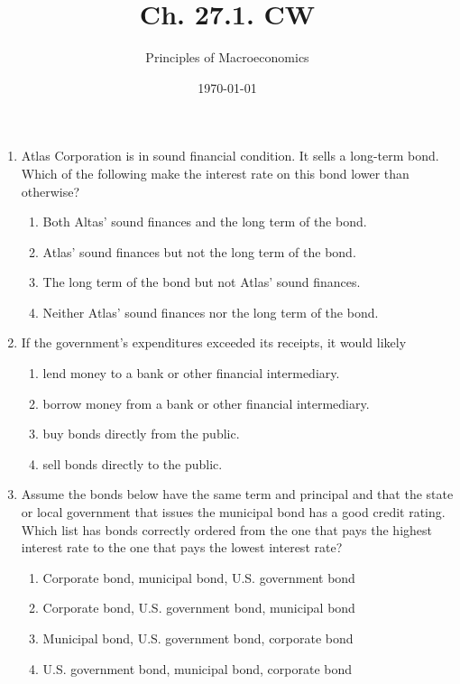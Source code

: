\documentclass{article}
\title{Ch. 27.1. CW}
\author{Principles of Macroeconomics}
\date{\today}
\begin{document}
\maketitle

\begin{enumerate}

\item Atlas Corporation is in sound financial condition. It sells a long-term bond. Which of the following make the interest
rate on this bond lower than otherwise?
	\begin{enumerate}
	\item Both Altas' sound finances and the long term of the bond.	
	\item Atlas' sound finances but not the long term of the bond.
	\item The long term of the bond but not Atlas' sound finances.
	\item Neither Atlas' sound finances nor the long term of the bond.
	\end{enumerate}
	
\item If the government's expenditures exceeded its receipts, it would likely
	\begin{enumerate}
	\item	lend money to a bank or other financial intermediary.
	\item borrow money from a bank or other financial intermediary.
	\item buy bonds directly from the public.
	\item sell bonds directly to the public.
	\end{enumerate}
	
\item Assume the bonds below have the same term and principal and that the state or local government that issues the
municipal bond has a good credit rating. Which list has bonds correctly ordered from the one that pays the highest
interest rate to the one that pays the lowest interest rate?
	\begin{enumerate}
	\item Corporate bond, municipal bond, U.S. government bond
	\item Corporate bond, U.S. government bond, municipal bond
	\item Municipal bond, U.S. government bond, corporate bond
	\item U.S. government bond, municipal bond, corporate bond
	\end{enumerate}
	

\end{enumerate}
\end{document}
